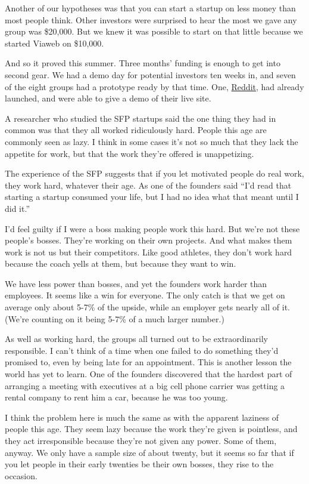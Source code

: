 \documentclass[12pt]{book}
\begin{document}
Another of our hypotheses was that you can start a startup on less money
than most people think. Other investors were surprised to hear the most
we gave any group was \$20,000. But we knew it was possible to start on
that little because we started Viaweb on \$10,000.

And so it proved this summer. Three months' funding is enough to get
into second gear. We had a demo day for potential investors ten weeks
in, and seven of the eight groups had a prototype ready by that time.
One, \href{http://reddit.com}{Reddit}, had already launched, and were
able to give a demo of their live site.

A researcher who studied the SFP startups said the one thing they had in
common was that they all worked ridiculously hard. People this age are
commonly seen as lazy. I think in some cases it's not so much that they
lack the appetite for work, but that the work they're offered is
unappetizing.

The experience of the SFP suggests that if you let motivated people do
real work, they work hard, whatever their age. As one of the founders
said ``I'd read that starting a startup consumed your life, but I had no
idea what that meant until I did it.''

I'd feel guilty if I were a boss making people work this hard. But we're
not these people's bosses. They're working on their own projects. And
what makes them work is not us but their competitors. Like good
athletes, they don't work hard because the coach yells at them, but
because they want to win.

We have less power than bosses, and yet the founders work harder than
employees. It seems like a win for everyone. The only catch is that we
get on average only about 5-7\% of the upside, while an employer gets
nearly all of it. (We're counting on it being 5-7\% of a much larger
number.)

As well as working hard, the groups all turned out to be extraordinarily
responsible. I can't think of a time when one failed to do something
they'd promised to, even by being late for an appointment. This is
another lesson the world has yet to learn. One of the founders
discovered that the hardest part of arranging a meeting with executives
at a big cell phone carrier was getting a rental company to rent him a
car, because he was too young.

I think the problem here is much the same as with the apparent laziness
of people this age. They seem lazy because the work they're given is
pointless, and they act irresponsible because they're not given any
power. Some of them, anyway. We only have a sample size of about twenty,
but it seems so far that if you let people in their early twenties be
their own bosses, they rise to the occasion.
\end{document}
